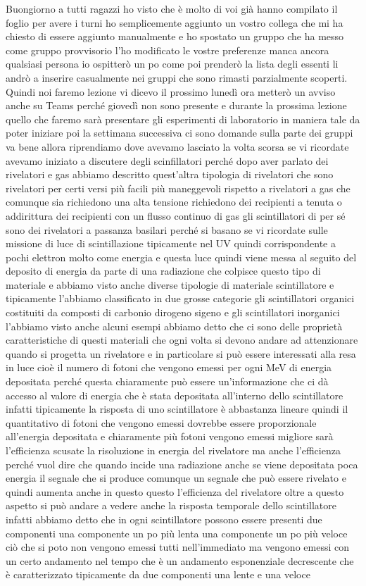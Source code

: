 Buongiorno a tutti ragazzi ho visto che è molto di voi già hanno compilato il foglio per avere i turni ho semplicemente aggiunto un vostro collega che mi ha chiesto di essere aggiunto manualmente e ho spostato un gruppo che ha messo come gruppo provvisorio l'ho modificato le vostre preferenze manca ancora qualsiasi persona io ospitterò un po come poi prenderò la lista degli essenti li andrò a inserire casualmente nei gruppi che sono rimasti parzialmente scoperti. Quindi noi faremo lezione vi dicevo il prossimo lunedì ora metterò un avviso anche su Teams perché giovedì non sono presente e durante la prossima lezione quello che faremo sarà presentare gli esperimenti di laboratorio in maniera tale da poter iniziare poi la settimana successiva ci sono domande sulla parte dei gruppi va bene allora riprendiamo dove avevamo lasciato la volta scorsa se vi ricordate avevamo iniziato a discutere degli scinfillatori perché dopo aver parlato dei rivelatori e gas abbiamo descritto quest'altra tipologia di rivelatori che sono rivelatori per certi versi più facili più maneggevoli rispetto a rivelatori a gas che comunque sia richiedono una alta tensione richiedono dei recipienti a tenuta o addirittura dei recipienti con un flusso continuo di gas gli scintillatori di per sé sono dei rivelatori a passanza basilari perché si basano se vi ricordate sulle missione di luce di scintillazione tipicamente nel UV quindi corrispondente a pochi elettron molto come energia e questa luce quindi viene messa al seguito del deposito di energia da parte di una radiazione che colpisce questo tipo di materiale e abbiamo visto anche diverse tipologie di materiale scintillatore e tipicamente l'abbiamo classificato in due grosse categorie gli scintillatori organici costituiti da composti di carbonio dirogeno sigeno e gli scintillatori inorganici l'abbiamo visto anche alcuni esempi abbiamo detto che ci sono delle proprietà caratteristiche di questi materiali che ogni volta si devono andare ad attenzionare quando si progetta un rivelatore e in particolare si può essere interessati alla resa in luce cioè il numero di fotoni che vengono emessi per ogni MeV di energia depositata perché questa chiaramente può essere un'informazione che ci dà accesso al valore di energia che è stata depositata all'interno dello scintillatore infatti tipicamente la risposta di uno scintillatore è abbastanza lineare quindi il quantitativo di fotoni che vengono emessi dovrebbe essere proporzionale all'energia depositata e chiaramente più fotoni vengono emessi migliore sarà l'efficienza scusate la risoluzione in energia del rivelatore ma anche l'efficienza perché vuol dire che quando incide una radiazione anche se viene depositata poca energia il segnale che si produce comunque un segnale che può essere rivelato e quindi aumenta anche in questo questo l'efficienza del rivelatore oltre a questo aspetto si può andare a vedere anche la risposta temporale dello scintillatore infatti abbiamo detto che in ogni scintillatore possono essere presenti due componenti una componente un po più lenta una componente un po più veloce ciò che si poto non vengono emessi tutti nell'immediato ma vengono emessi con un certo andamento nel tempo che è un andamento esponenziale decrescente che è caratterizzato tipicamente da due componenti una lente e una veloce 